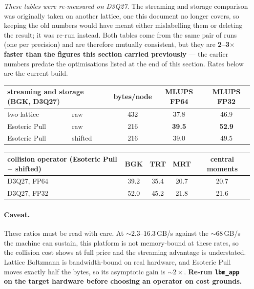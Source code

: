 \documentclass[11pt,a4paper]{article}
\newcommand{\code}[1]{\texttt{\small #1}}
\begin{document}
\emph{These tables were re-measured on D3Q27.} The streaming and storage
comparison was originally taken on another lattice, one this document no longer
covers, so keeping the old numbers would have meant either mislabelling them or
deleting the result; it was re-run instead. Both
tables come from the same pair of runs (one per precision) and are therefore
mutually consistent, but they are \textbf{2--3$\times$ faster than the figures
this section carried previously} --- the earlier numbers predate the
optimisations listed at the end of this section. Rates below are the current
build.

\begin{center}\small
\begin{tabular}{llccc}
\toprule
\multicolumn{2}{l}{streaming and storage (BGK, D3Q27)} & bytes/node & MLUPS FP64 & MLUPS FP32 \\
\midrule
two-lattice   & raw     & 432 & 37.8 & 46.9 \\
Esoteric Pull & raw     & 216 & \textbf{39.5} & \textbf{52.9} \\
Esoteric Pull & shifted & 216 & 39.0 & 49.5 \\
\bottomrule
\end{tabular}
\end{center}

\begin{center}\small
\begin{tabular}{lcccc}
\toprule
collision operator (Esoteric Pull $+$ shifted) & BGK & TRT & MRT & central moments \\
\midrule
D3Q27, FP64 & 39.2 & 35.4 & 20.7 & 20.7 \\
D3Q27, FP32 & 52.0 & 45.2 & 21.8 & 21.6 \\
\bottomrule
\end{tabular}
\end{center}

\paragraph{Caveat.} These ratios must be read with care. At $\sim2.3$--$16.3$\,GB/s
against the $\sim68$\,GB/s the machine can sustain, this platform is not
memory-bound at these rates, so the collision cost shows at full price and the
streaming advantage is understated. Lattice Boltzmann is bandwidth-bound on real
hardware, and Esoteric Pull moves exactly half the bytes, so its asymptotic gain
is $\sim2\times$. \textbf{Re-run \code{lbm\_app} on the target hardware before
choosing an operator on cost grounds.}
\end{document}
